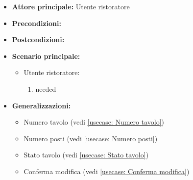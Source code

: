 \label{usecase:Modifica tavolo}
\begin{itemize}
\item \textbf{Attore principale:}  Utente ristoratore
\item \textbf{Precondizioni:}
\item \textbf{Postcondizioni:}
\item \textbf{Scenario principale:}
\begin{itemize}
\item  Utente ristoratore:
\begin{enumerate}
\item needed
\end{enumerate}
\end{itemize}
\item \textbf{Generalizzazioni:}
\begin{itemize}
\item  Numero tavolo (vedi \autoref{usecase: Numero tavolo})
\item  Numero posti (vedi \autoref{usecase: Numero posti})
\item  Stato tavolo (vedi \autoref{usecase: Stato tavolo})
\item  Conferma modifica (vedi \autoref{usecase: Conferma modifica})
\end{itemize}
\end{itemize}